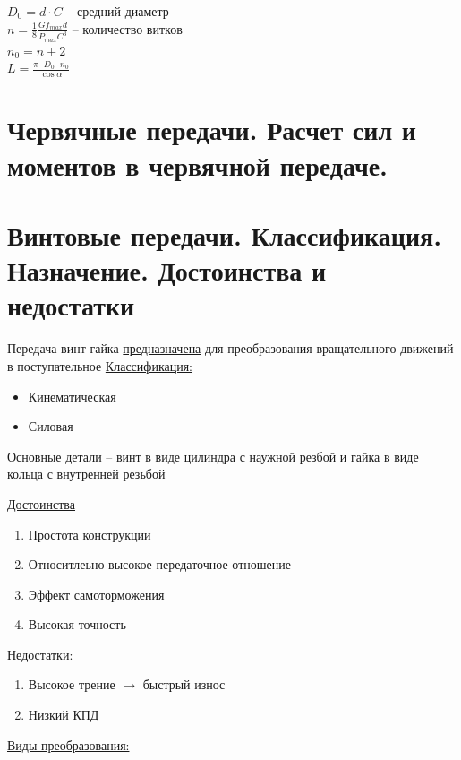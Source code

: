 \documentclass{article}
\begin{document}
\begin{multicols}{3}
\begin{enumerate}
	$D_0 = d \cdot C$ -- средний диаметр\\
	$n = \frac{1}{8} \frac{G f_{max} d }{P_{max} C^3} $ -- количество витков\\
	$n_0 = n + 2$\\
	$L = \frac{\pi \cdot D_0 \cdot n_0}{\cos{ \alpha}} $
\end{enumerate}
\section {\tiny Червячные передачи. Расчет сил и моментов в червячной передаче.}



\section {\tiny Винтовые передачи. Классификация. Назначение. Достоинства и недостатки}

Передача винт-гайка \underline{предназначена} для преобразования вращательного движений в поступательное
\underline{Классификация:}
\begin{itemize}
	\item Кинематическая
	\item Силовая
\end{itemize}

Основные детали -- винт в виде цилиндра с наужной резбой и гайка в виде кольца с внутренней резьбой

\underline{Достоинства}
\begin{enumerate}
	\item Простота конструкции
	\item Относитлеьно высокое передаточное отношение
	\item Эффект самоторможения
	\item Высокая точность
\end{enumerate}
\underline{Недостатки:} 
\begin{enumerate}
	\item Высокое трение $\to$ быстрый износ
	\item Низкий КПД
\end{enumerate}

\underline{Виды преобразования:} 


\end{multicols}
\end{document}
